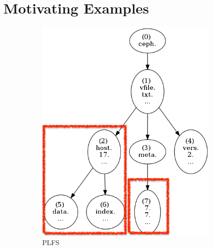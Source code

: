 \section{Motivating Examples}


\begin{figure}[t]
  \centering
  \begin{subfigure}[b]{.3\linewidth}
      \centering
      \includegraphics[width=1.0\linewidth]{figures/tree_plfs.png}
      \caption{PLFS} \label{fig:plfs}
  \end{subfigure}
  \begin{subfigure}[b]{.3\linewidth}
      \centering

\end{subfigure}
\end{figure}

